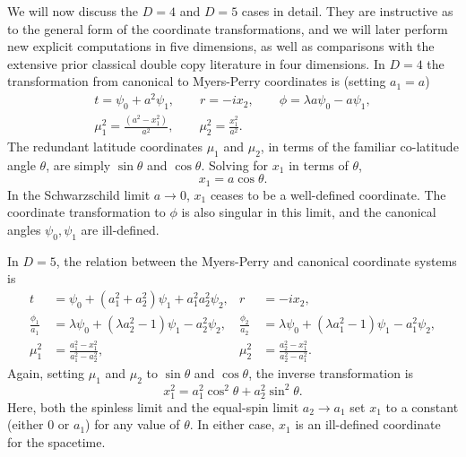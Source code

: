 We will now discuss the $D=4$ and $D=5$ cases in detail. They are instructive as to the general form of the
coordinate transformations, and we will later perform new explicit computations in five dimensions, as well as
comparisons with the extensive prior classical double copy literature in four dimensions. In $D = 4$ the
transformation from canonical to Myers-Perry coordinates is (setting $a_{1} = a$) 
%
\begin{equation} \label{5D:CanonicalToMyersPerryD=4} 
    \begin{gathered}
    t = \psi_{0} + a^{2} \psi_{1},\qquad r = -i x_{2},\qquad \phi = \lambda a \psi_{0} - a \psi_{1}, \\
    \mu_{1}^{2} = \frac{(a^{2} - x_{1}^{2})}{a^{2}}, \qquad \mu_{2}^{2} = \frac{x_{1}^{2}}{a^{2}}.
    \end{gathered}
\end{equation}
The redundant latitude coordinates $\mu_{1}$ and $\mu_{2}$, in terms of the familiar
co-latitude angle $\theta$, are simply $\sin\theta$ and $\cos\theta$. Solving for $x_{1}$ in terms of $\theta$, 
%
\begin{equation} \label{5D:x1ToThetaD=4} 
    x_{1} = a \cos\theta.
\end{equation}
%
In the Schwarzschild limit $a \to 0$, $x_{1}$ ceases to be a well-defined coordinate. The coordinate transformation
to $\phi$ is also singular in this limit, and the canonical angles $\psi_{0}, \psi_{1}$ are ill-defined.

In $D=5$, the relation between the Myers-Perry and canonical coordinate systems is 
%
\begin{align} \label{5D:CanonicalToMyersPerryD=5} 
        t &= \psi_{0} + (a_{1}^{2} + a_{2}^{2}) \psi_{1} + a_{1}^{2} a_{2}^{2}
        \psi_{2}, & r &= -i x_{2}, \nonumber \\
        \frac{\phi_{1}}{a_{1}} &= \lambda \psi_{0} + (\lambda a_{2}^{2} - 1) \psi_{1} -
        a_{2}^{2} \psi_{2}, & \frac{\phi_{2}}{a_{2}} &= \lambda \psi_{0} + (\lambda a_{1}^{2} - 1) \psi_{1} - a_{1}^{2} \psi_{2}, \\
        \mu_{1}^{2} &= \frac{a_{1}^{2} - x_{1}^{2}}{a_{1}^{2} - a_{2}^{2}}, & \mu_{2}^{2} &= \frac{a_{2}^{2} -
        x_{1}^{2}}{a_{2}^{2} - a_{1}^{2}}. \nonumber
\end{align}
%
Again, setting $\mu_{1}$ and $\mu_{2}$ to $\sin\theta$ and $\cos\theta$, the inverse transformation is
%
\begin{equation} 
    x_{1}^{2} = a_{1}^{2} \cos^{2}\theta + a_{2}^{2} \sin^{2}\theta.
\end{equation}
%
Here, both the spinless limit and the equal-spin limit $a_{2} \to a_{1}$ set $x_{1}$ to a constant (either $0$ or
$a_{1}$) for any value of $\theta$. In either case, $x_{1}$ is an ill-defined coordinate for the spacetime. 


